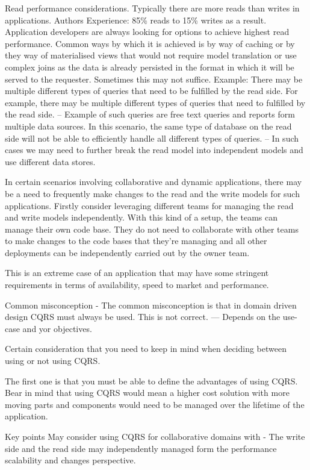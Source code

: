Read performance considerations.
Typically there are more reads than writes in applications.
Authors Experience: 85\% reads to 15\% writes as a result.
Application developers are always looking for options to achieve highest read performance.
Common ways by which it is achieved is by way of caching or by they way of materialised views that would not require model translation or use complex joins as the data is already persisted in the format in which it will be served to the requester.
Sometimes this may not suffice.
Example:
There may be multiple different types of queries that need to be fulfilled by the read side.
For example, there may be multiple different types of queries that need to fulfilled by the read side.
-- Example of such queries are free text queries and reports form multiple data sources.
In this scenario, the same type of database on the read side will not be able to efficiently handle all different types of queries.
-- In such cases we may need to further break the read model into independent models and use different data stores.

In certain scenarios involving collaborative and dynamic applications, there may be a need to frequently make changes to the read and the write models for such applications.
Firstly consider leveraging different teams for managing the read and write models independently.
With this kind of a setup, the teams can manage their own code base.
They do not need to collaborate with other teams to make changes to the code bases that they're managing and all other deployments can be independently carried out by the owner team.

This is an extreme case of an application that may have some stringent requirements in terms of availability, speed to market and performance.

Common misconception
- The common misconception is that in domain driven design CQRS must always be used. This is not correct.
--- Depends on the use-case and yor objectives.

Certain consideration that you need to keep in mind when deciding between using or not using CQRS.

The first one is that you must be able to define the advantages of using CQRS.
Bear in mind that using CQRS would mean a higher cost solution with more moving parts and components would need to be managed over the lifetime of the application.

Key points
May consider using CQRS for collaborative domains with
- The write side and the read side may independently managed form the performance scalability and changes perspective.


